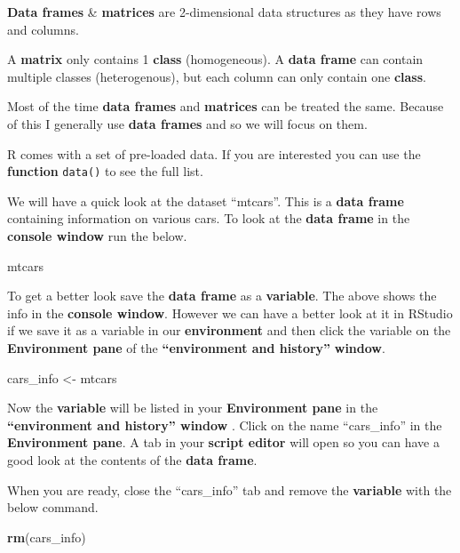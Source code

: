 \documentclass[]{book}
\newenvironment{Shaded}{\begin{snugshade}}{\end{snugshade}}
\newcommand{\KeywordTok}[1]{\textcolor[rgb]{0.13,0.29,0.53}{\textbf{#1}}}
\newcommand{\StringTok}[1]{\textcolor[rgb]{0.31,0.60,0.02}{#1}}
\newcommand{\NormalTok}[1]{#1}
\begin{document}
\textbf{Data frames} \& \textbf{matrices} are 2-dimensional data
structures as they have rows and columns.

A \textbf{matrix} only contains 1 \textbf{class} (homogeneous). A
\textbf{data frame} can contain multiple classes (heterogenous), but
each column can only contain one \textbf{class}.

Most of the time \textbf{data frames} and \textbf{matrices} can be
treated the same. Because of this I generally use \textbf{data frames}
and so we will focus on them.

R comes with a set of pre-loaded data. If you are interested you can use
the \textbf{function} \texttt{data()} to see the full list.

We will have a quick look at the dataset ``mtcars''. This is a
\textbf{data frame} containing information on various cars. To look at
the \textbf{data frame} in the \textbf{console window} run the below.

\begin{Shaded}
\begin{Highlighting}[]
\NormalTok{mtcars}
\end{Highlighting}
\end{Shaded}

To get a better look save the \textbf{data frame} as a
\textbf{variable}. The above shows the info in the \textbf{console
window}. However we can have a better look at it in RStudio if we save
it as a variable in our \textbf{environment} and then click the variable
on the \textbf{Environment pane} of the \textbf{``environment and
history''} \textbf{window}.

\begin{Shaded}
\begin{Highlighting}[]
\NormalTok{cars_info <-}\StringTok{ }\NormalTok{mtcars}
\end{Highlighting}
\end{Shaded}

Now the \textbf{variable} will be listed in your \textbf{Environment
pane} in the \textbf{``environment and history'' window} . Click on the
name ``cars\_info'' in the \textbf{Environment pane}. A tab in your
\textbf{script editor} will open so you can have a good look at the
contents of the \textbf{data frame}.

When you are ready, close the ``cars\_info'' tab and remove the
\textbf{variable} with the below command.

\begin{Shaded}
\begin{Highlighting}[]
\KeywordTok{rm}\NormalTok{(cars_info)}
\end{Highlighting}
\end{Shaded}
\end{document}
